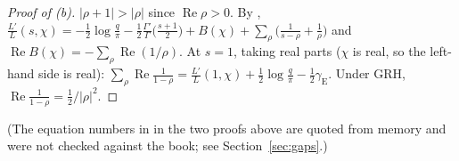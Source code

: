 \documentclass[11pt]{amsart}
\theoremstyle{definition}
\numberwithin{equation}{section}
\newcommand{\re}{\operatorname{Re}}
\begin{document}
\begin{proof}[Proof of \textup{(b)}]
$|\rho+1|>|\rho|$ since $\re\rho>0$. By \cite[Ch.~12, eqs.~(17),
(18)]{Dav00},
$\frac{L'}{L}(s,\chi)=-\tfrac12\log\frac q\pi
-\tfrac12\frac{\Gamma'}{\Gamma}\bigl(\frac{s+1}2\bigr)+B(\chi)
+\sum_\rho\bigl(\frac1{s-\rho}+\frac1\rho\bigr)$ and
$\re B(\chi)=-\sum_\rho\re(1/\rho)$. At $s=1$, taking real parts
($\chi$ is real, so the left-hand side is real):
$\sum_\rho\re\frac1{1-\rho}=\frac{L'}{L}(1,\chi)
+\tfrac12\log\frac q\pi-\tfrac12\gamma_{\mathrm E}$. Under GRH,
$\re\frac1{1-\rho}=\tfrac12/|\rho|^2$.
\end{proof}

(The equation numbers in \cite{Dav00} in the two proofs above are
quoted from memory and were not checked against the book; see
Section~\ref{sec:gaps}.)
\end{document}
